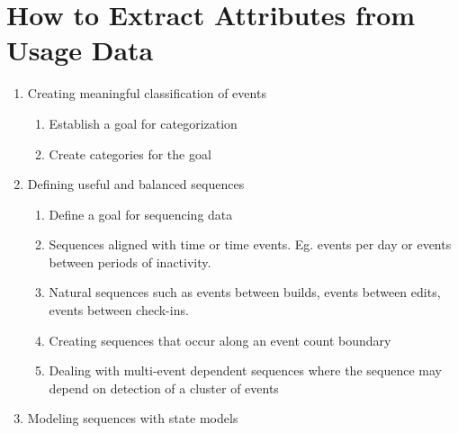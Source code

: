 \section{ How to Extract Attributes from Usage Data}


  \begin{enumerate}
  \item Creating meaningful classification of events
	\begin{enumerate}
	\item
	Establish a goal for categorization
	\item
	Create categories for the goal
	\end{enumerate}
  \item Defining useful and balanced sequences %
	\begin{enumerate}
	\item
	Define a goal for sequencing data
	\item
	Sequences aligned with time or time events.  Eg. events per day or events
	between periods of inactivity.
	\item
	Natural sequences such as events between builds, events between edits, events between check-ins.
	\item
	Creating sequences that occur along an event count boundary
	\item 
	Dealing with multi-event dependent sequences where the sequence may depend on detection of a cluster of events
	\end{enumerate}
  \item  Modeling sequences with state models %
  \end{enumerate}